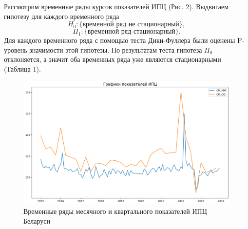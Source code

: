 \documentclass[a4paper, 12pt]{extarticle}
\numberwithin{equation}{subsection}
\begin{document}
	Рассмотрим временные ряды курсов показателей ИПЦ (Рис. 2).
	Выдвигаем гипотезу для каждого временного ряда
	$$H_0 : \{\text{временной ряд не стационарный}\},$$
	$$H_1 : \{\text{временной ряд стационарный}\}.$$
	Для каждого временного ряда с помощью теста Дики-Фуллера были оценены P-уровень значимости этой гипотезы. По результатам теста гипотеза $H_0$ отклоняется, а значит оба временных ряда уже являются стационарными (Таблица 1). 
	
	\begin{figure}[h]
		\centering
		\includegraphics[scale=0.5]{images/img03}
		\caption{Временные ряды месячного и квартального показателей ИПЦ Беларуси}
		\label{fig:img03}
	\end{figure}
	
	
\end{document}
